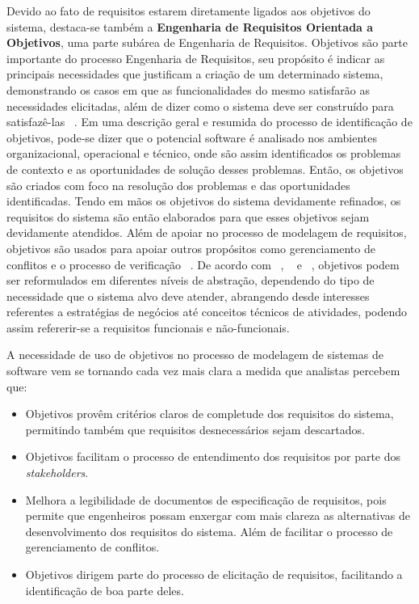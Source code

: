 Devido ao fato de requisitos estarem diretamente ligados aos objetivos do sistema, destaca-se também a \textbf{Engenharia de Requisitos Orientada a Objetivos}, uma parte subárea de Engenharia de Requisitos. Objetivos são parte importante do processo Engenharia de Requisitos, seu propósito é indicar as principais necessidades que justificam a criação de um determinado sistema, demonstrando os casos em que as funcionalidades do mesmo satisfarão as necessidades elicitadas, além de dizer como o sistema deve ser construído para satisfazê-las ~\cite{ross1977structured}. Em uma descrição geral e resumida do processo de identificação de objetivos, pode-se dizer que o potencial software é analisado nos ambientes organizacional, operacional e técnico, onde são assim identificados os problemas de contexto e as oportunidades de solução desses problemas. Então, os objetivos são criados com foco na resolução dos problemas e das oportunidades identificadas. Tendo em mãos os objetivos do sistema devidamente refinados, os requisitos do sistema são então elaborados para que esses objetivos sejam devidamente atendidos. Além de apoiar no processo de modelagem de requisitos, objetivos são usados para apoiar outros propósitos como gerenciamento de conflitos e o processo de verificação ~\cite{van2001goal}. De acordo com ~\cite{van2001goal}, ~\cite{jackson1995software} e ~\cite{zave1997four}, objetivos podem ser reformulados em diferentes níveis de abstração, dependendo do tipo de necessidade que o sistema alvo deve atender, abrangendo desde interesses referentes a estratégias de negócios até conceitos técnicos de atividades, podendo assim refererir-se a requisitos funcionais e não-funcionais.

A necessidade de uso de objetivos no processo de modelagem de sistemas de software vem se tornando cada vez mais clara a medida que analistas percebem que:
\begin{itemize}
	\item Objetivos provêm critérios claros de completude dos requisitos do sistema, permitindo também que requisitos desnecessários sejam descartados.
	\item Objetivos facilitam o processo de entendimento dos requisitos por parte dos \textit{stakeholders}.
	\item Melhora a legibilidade de documentos de especificação de requisitos, pois permite que engenheiros possam enxergar com mais clareza as alternativas de desenvolvimento dos requisitos do sistema. Além de facilitar o processo de gerenciamento de conflitos.
	\item Objetivos dirigem parte do processo de elicitação de requisitos, facilitando a identificação de boa parte deles.	
\end{itemize}

